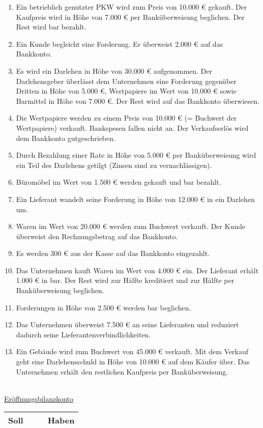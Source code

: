 \documentclass[paper=a4, fontsize=11pt]{scrartcl}
\numberwithin{equation}{section}
\numberwithin{figure}{section}
\numberwithin{table}{section}
\begin{document}
 \begin{enumerate}
 \item Ein betrieblich genutzter PKW wird zum Preis von 10.000 € gekauft. Der Kaufpreis wird in Höhe von 7.000 € per Banküberweisung beglichen. Der Rest wird bar bezahlt.
 \item Ein Kunde begleicht eine Forderung. Er überweist 2.000 € auf das Bankkonto. 
 \item Es wird ein Darlehen in Höhe von 30.000 € aufgenommen. Der Darlehensgeber überlässt dem Unternehmen eine Forderung gegenüber Dritten in Höhe von 5.000 €, Wertpapiere im Wert von 10.000 € sowie Barmittel in Höhe von 7.000 €. Der Rest wird auf das Bankkonto überwiesen.
 \item Die Wertpapiere werden zu einem Preis von 10.000 € (= Buchwert der Wertpapiere) verkauft. Bankspesen fallen nicht an. Der Verkaufserlös wird dem Bankkonto gutgeschrieben.
 \item Durch Bezahlung einer Rate in Höhe von 5.000 € per Banküberweisung wird ein Teil des Darlehens getilgt (Zinsen sind zu vernachlässigen).
 \item Büromöbel im Wert von 1.500 € werden gekauft und bar bezahlt.
 \item Ein Lieferant wandelt seine Forderung in Höhe von 12.000 € in ein Darlehen um.
 \item Waren im Wert von 20.000 € werden zum Buchwert verkauft. Der Kunde überweist den Rechnungsbetrag auf das Bankkonto.
 \item Es werden 300 € aus der Kasse auf das Bankkonto eingezahlt.
 \item Das Unternehmen kauft Waren im Wert von 4.000 € ein. Der Lieferant erhält 1.000 € in bar. Der Rest wird zur Hälfte kreditiert und zur Hälfte per Banküberweisung beglichen.
 \item Forderungen in Höhe von 2.500 € werden bar beglichen.
 \item Das Unternehmen überweist 7.500 € an seine Lieferanten und reduziert dadurch seine Lieferantenverbindlichkeiten.
 \item Ein Gebäude wird zum Buchwert von 45.000 € verkauft. Mit dem Verkauf geht eine Darlehensschuld in Höhe von 10.000 € auf dem Käufer über. Das Unternehmen erhält den restlichen Kaufpreis per Banküberweisung.
 \end{enumerate}
\\

\underline{Eröffnungsbilanzkonto}

\begin{tabular}{cc|cc}
\hline
Soll & & & Haben \\
\hline
 
\end{tabular}
\\
\end{document}
